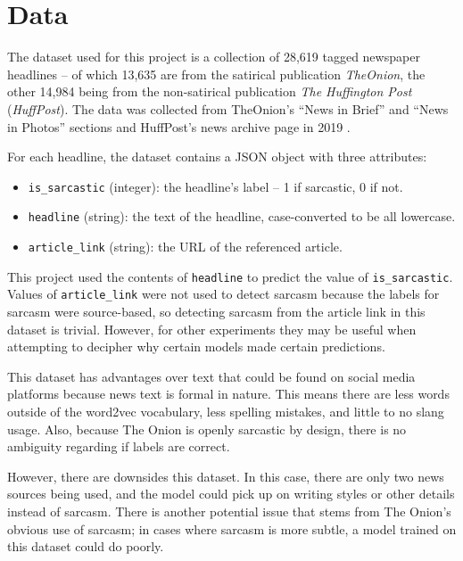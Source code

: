 \documentclass[11pt]{article}
\begin{document}
\section{Data}\label{sec:data}

The dataset used for this project is a collection
of 28,619 tagged newspaper headlines --
of which 13,635 are from the satirical publication \textit{TheOnion},
the other 14,984 being from the non-satirical publication \textit{The Huffington Post} (\textit{HuffPost}).
The data was collected from TheOnion's ``News in Brief'' and ``News in Photos'' sections
and HuffPost's news archive page in 2019 \cite{misra2023Sarcasm}.

For each headline, the dataset contains a JSON object with three attributes:
\begin{itemize}
    \item \texttt{is\_sarcastic} (integer): the headline's label -- 1 if
          sarcastic, 0 if not.
    \item \texttt{headline} (string): the text of the headline, case-converted
          to be all lowercase.
    \item \texttt{article\_link} (string): the URL of the referenced article.
\end{itemize}

This project used the contents of \texttt{headline} to predict
the value of \texttt{is\_sarcastic}.
Values of \texttt{article\_link} were not used to detect sarcasm
because the labels for sarcasm were source-based,
so detecting sarcasm from the article link in this dataset is trivial.
However, for other experiments they may be useful when attempting
to decipher why certain models made certain predictions.

This dataset has advantages over text that could be found on social media
platforms because news text is formal in nature.
This means there are less words outside of the word2vec vocabulary,
less spelling mistakes, and little to no slang usage.
Also, because The Onion is openly sarcastic by design,
there is no ambiguity regarding if labels are correct.

However, there are downsides this dataset.
In this case, there are only two news sources being used,
and the model could pick up on writing styles or other details instead of sarcasm.
There is another potential issue that stems from The Onion's obvious use of sarcasm;
in cases where sarcasm is more subtle,
a model trained on this dataset could do poorly.
\end{document}
